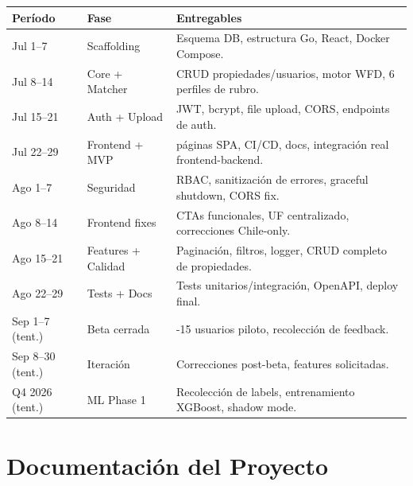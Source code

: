 \documentclass[11pt,a4paper]{article}
\begin{document}
\begin{table}[H]
    \centering
    \renewcommand{\arraystretch}{1.3}
    \begin{tabularx}{\textwidth}{>{\hsize=0.18\hsize}X >{\hsize=0.27\hsize}X >{\hsize=0.55\hsize}X}
        \toprule
        \textbf{Período} & \textbf{Fase} & \textbf{Entregables} \\
        \midrule
        Jul 1--7 & Scaffolding & Esquema DB, estructura Go, React, Docker Compose. \\
        Jul 8--14 & Core + Matcher & CRUD propiedades/usuarios, motor WFD, 6 perfiles de rubro. \\
        Jul 15--21 & Auth + Upload & JWT, bcrypt, file upload, CORS, endpoints de auth. \\
        Jul 22--29 & Frontend + MVP & 8 páginas SPA, CI/CD, docs, integración real frontend-backend. \\
        \midrule
        Ago 1--7 & Seguridad & RBAC, sanitización de errores, graceful shutdown, CORS fix. \\
        Ago 8--14 & Frontend fixes & CTAs funcionales, UF centralizado, correcciones Chile-only. \\
        Ago 15--21 & Features + Calidad & Paginación, filtros, logger, CRUD completo de propiedades. \\
        Ago 22--29 & Tests + Docs & Tests unitarios/integración, OpenAPI, deploy final. \\
        \midrule
        Sep 1--7 (tent.) & Beta cerrada & 10-15 usuarios piloto, recolección de feedback. \\
        Sep 8--30 (tent.) & Iteración & Correcciones post-beta, features solicitadas. \\
        Q4 2026 (tent.) & ML Phase 1 & Recolección de labels, entrenamiento XGBoost, shadow mode. \\
        \bottomrule
    \end{tabularx}
\end{table}

\section{Documentación del Proyecto}
\end{document}
